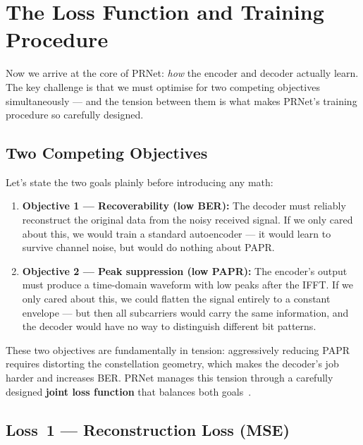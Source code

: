 \section{The Loss Function and Training Procedure}
\label{sec:prnet_training}

Now we arrive at the core of PRNet: \emph{how} the encoder and decoder
actually learn.  The key challenge is that we must optimise for two
competing objectives simultaneously --- and the tension between them
is what makes PRNet's training procedure so carefully designed.


\subsection{Two Competing Objectives}

Let's state the two goals plainly before introducing any math:

\begin{enumerate}
    \item \textbf{Objective 1 --- Recoverability (low BER):}
          The decoder must reliably reconstruct the original data from the
          noisy received signal.  If we only cared about this, we would train
          a standard autoencoder --- it would learn to survive channel noise,
          but would do nothing about PAPR.

    \item \textbf{Objective 2 --- Peak suppression (low PAPR):}
          The encoder's output must produce a time-domain waveform with
          low peaks after the IFFT.  If we only cared about this, we could
          flatten the signal entirely to a constant envelope --- but then
          all subcarriers would carry the same information, and the decoder
          would have no way to distinguish different bit patterns.
\end{enumerate}

These two objectives are fundamentally in tension: aggressively reducing
PAPR requires distorting the constellation geometry, which makes the
decoder's job harder and increases BER.  PRNet manages this tension through
a carefully designed \textbf{joint loss function} that balances both
goals~\cite{kim2017novel}.


\subsection{Loss~1 --- Reconstruction Loss (MSE)}

